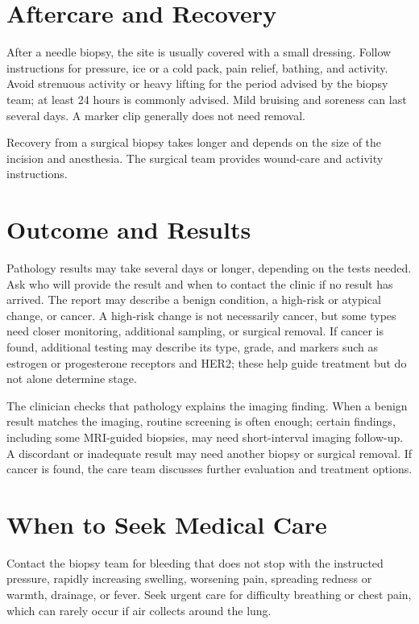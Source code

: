 \section*{Aftercare and Recovery}
After a needle biopsy, the site is usually covered with a small dressing. Follow instructions for pressure, ice or a cold pack, pain relief, bathing, and activity. Avoid strenuous activity or heavy lifting for the period advised by the biopsy team; at least 24 hours is commonly advised. Mild bruising and soreness can last several days. A marker clip generally does not need removal.

Recovery from a surgical biopsy takes longer and depends on the size of the incision and anesthesia. The surgical team provides wound-care and activity instructions.

\section*{Outcome and Results}
Pathology results may take several days or longer, depending on the tests needed. Ask who will provide the result and when to contact the clinic if no result has arrived. The report may describe a benign condition, a high-risk or atypical change, or cancer. A high-risk change is not necessarily cancer, but some types need closer monitoring, additional sampling, or surgical removal. If cancer is found, additional testing may describe its type, grade, and markers such as estrogen or progesterone receptors and HER2; these help guide treatment but do not alone determine stage.

The clinician checks that pathology explains the imaging finding. When a benign result matches the imaging, routine screening is often enough; certain findings, including some MRI-guided biopsies, may need short-interval imaging follow-up. A discordant or inadequate result may need another biopsy or surgical removal. If cancer is found, the care team discusses further evaluation and treatment options.

\section*{When to Seek Medical Care}
Contact the biopsy team for bleeding that does not stop with the instructed pressure, rapidly increasing swelling, worsening pain, spreading redness or warmth, drainage, or fever. Seek urgent care for difficulty breathing or chest pain, which can rarely occur if air collects around the lung.

